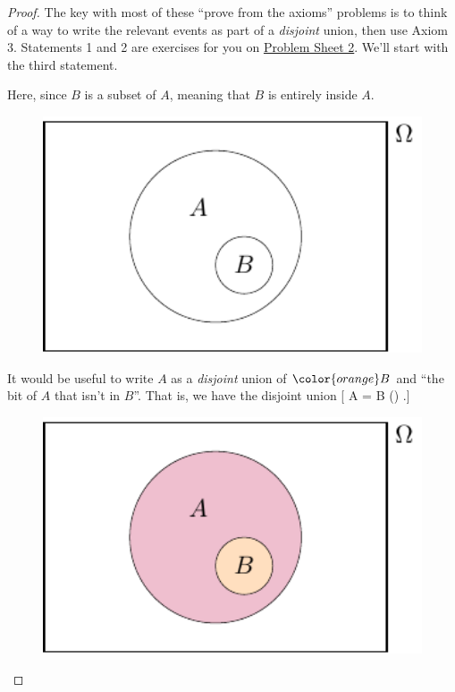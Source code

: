 \documentclass[
  letterpaper,
  DIV=11,
  numbers=noendperiod]{scrreprt}
\theoremstyle{remark}
\begin{document}
\begin{proof}

The key with most of these ``prove from the axioms'' problems is to
think of a way to write the relevant events as part of a \emph{disjoint}
union, then use Axiom 3. Statements 1 and 2 are exercises for you on
\protect\hyperlink{P2}{Problem Sheet 2}. We'll start with the third
statement.

Here, since \(B\) is a subset of \(A\), meaning that \(B\) is entirely
inside \(A\).

\begin{figure}

{\centering \includegraphics[width=4.44444in,height=\textheight]{sections/L04-probability_files/figure-pdf/subs0-1.pdf}

}

\end{figure}

It would be useful to write \(A\) as a \emph{disjoint} union of
\(\color{orange}B\) and {``the bit of \(A\) that isn't in \(B\)''}. That
is, we have the disjoint union {[} A = \color{orange}B
\cup () .{]}

\begin{figure}

{\centering \includegraphics[width=4.44444in,height=\textheight]{sections/L04-probability_files/figure-pdf/subs-1.pdf}

}
\end{figure}
\end{proof}
\end{document}
